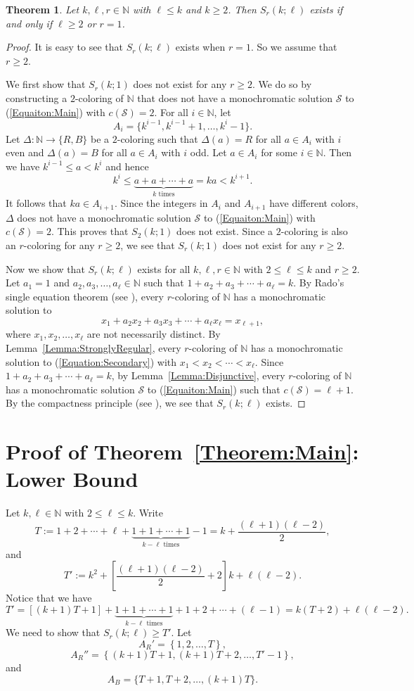 \documentclass[11pt]{article}
\newtheorem{theorem}{Theorem}[section]
\theoremstyle{definition}
\begin{document}
\begin{theorem}
Let $k,\ell,r\in\mathbb{N}$ with $\ell\leq k$ and $k\geq2$. Then $S_r(k;\ell)$ exists if and only if $\ell\geq2$ or $r=1$.
\end{theorem}
\begin{proof}
It is easy to see that $S_r(k;\ell)$ exists when $r=1$. So we assume that $r\geq2$. 

We first show that $S_r(k;1)$ does not exist for any $r\geq2$. We do so by constructing a $2$-coloring of $\mathbb{N}$ that does not have a monochromatic solution $\mathcal{S}$ to (\ref{Equaiton:Main}) with $c(\mathcal{S})=2$. For all $i\in\mathbb{N}$, let
\[
A_i=\{k^{i-1},k^{i-1}+1,\ldots,k^i-1\}.
\]
Let $\Delta:\mathbb{N}\to\{R,B\}$ be a $2$-coloring such that $\Delta(a)=R$ for all $a\in A_i$ with $i$ even and $\Delta(a)=B$ for all $a\in A_i$ with $i$ odd. Let $a\in A_i$ for some $i\in\mathbb{N}$. Then we have $k^{i-1}\leq a<k^i$ and hence
\[
k^i\leq \underbrace{a+a+\cdots+a}_{k\text{ times}}=ka<k^{i+1}.
\]
It follows that $ka\in A_{i+1}$. Since the integers in $A_i$ and $A_{i+1}$ have different colors, $\Delta$ does not have a monochromatic solution $\mathcal{S}$ to (\ref{Equaiton:Main}) with $c(\mathcal{S})=2$. This proves that $S_2(k;1)$ does not exist. Since a $2$-coloring is also an $r$-coloring for any $r\geq2$, we see that $S_r(k;1)$ does not exist for any $r\geq2$.

Now we show that $S_r(k;\ell)$ exists for all $k,\ell,r\in\mathbb{N}$ with $2\leq\ell\leq k$ and $r\geq2$. Let $a_1=1$ and $a_2,a_3,\ldots,a_\ell\in\mathbb{N}$ such that $1+a_2+a_3+\cdots+a_{\ell}=k$. By Rado's single equation theorem (see \cite[Theorem 9.5]{LR2014}), every $r$-coloring of $\mathbb{N}$ has a monochromatic solution to
\begin{equation}\label{Equation:Secondary}
x_1+a_2x_2+a_3x_3+\cdots+a_{\ell}x_\ell=x_{\ell+1},
\end{equation}
where $x_1,x_2,\ldots,x_\ell$ are not necessarily distinct. By Lemma~\ref{Lemma:StronglyRegular}, every $r$-coloring of $\mathbb{N}$ has a monochromatic solution to (\ref{Equation:Secondary}) with $x_1<x_2<\cdots<x_{\ell}$. Since $1+a_2+a_3+\cdots+a_{\ell}=k$, by Lemma~\ref{Lemma:Disjunctive}, every $r$-coloring of $\mathbb{N}$ has a monochromatic solution $\mathcal{S}$ to (\ref{Equaiton:Main}) such that $c(\mathcal{S})=\ell+1$. By the compactness principle (see \cite[Theorem 2.4]{LR2014}), we see that $S_r(k;\ell)$ exists.
\end{proof}
\section{Proof of Theorem~\ref{Theorem:Main}: Lower Bound}\label{Section:Lower_Bound}
Let $k,\ell\in\mathbb{N}$ with $2\leq\ell\leq k$. Write
\[
T:=1+2+\cdots+\ell+\underbrace{1+1+\cdots+1}_{k-\ell\text{ times}}-1=k+\frac{(\ell+1)(\ell-2)}{2},
\]
and 
\[
T':=k^2+\left[\frac{(\ell+1)(\ell-2)}{2}+2\right]k+\ell(\ell-2).
\]
Notice that we have
\[
T'=[(k+1)T+1]+\underbrace{1+1+\cdots+1}_{k-\ell\text{ times}}+1+2+\cdots+(\ell-1)=k(T+2)+\ell(\ell-2).
\]
We need to show that $S_r(k;\ell)\geq T'$. Let 
\[
A_R'=\left\{1,2,\ldots,T\right\},
\]
\[
A_R''=\left\{(k+1)T+1,(k+1)T+2,\ldots,T'-1
\right\},
\]
and
\[
A_B=\{T+1,T+2,\ldots,(k+1)T\}.
\]
\end{document}
